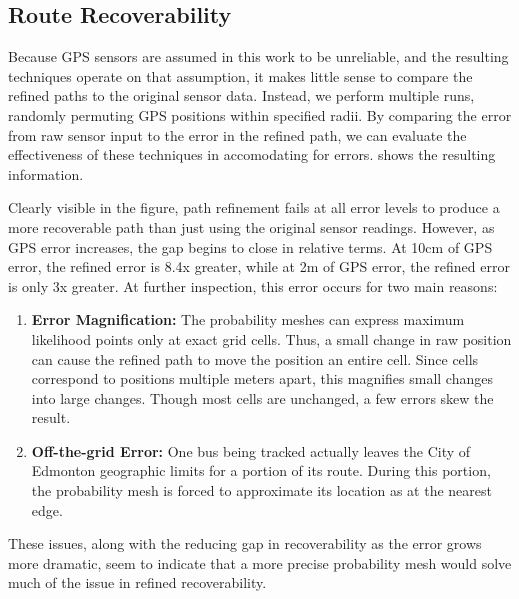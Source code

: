 

\subsection{Route Recoverability}

Because GPS sensors are assumed in this work to be unreliable, and the resulting techniques operate on that assumption, it makes little sense to compare the refined paths to the original sensor data. Instead, we perform multiple runs, randomly permuting GPS positions within specified radii. By comparing the error from raw sensor input to the error in the refined path, we can evaluate the effectiveness of these techniques in accomodating for errors.  shows the resulting information.



Clearly visible in the figure, path refinement fails at all error levels to produce a more recoverable path than just using the original sensor readings. However, as GPS error increases, the gap begins to close in relative terms. At 10cm of GPS error, the refined error is 8.4x greater, while at 2m of GPS error, the refined error is only 3x greater. At further inspection, this error occurs for two main reasons:
\begin{enumerate}
    \item \textbf{Error Magnification:} The probability meshes can express maximum likelihood points only at exact grid cells. Thus, a small change in raw position can cause the refined path to move the position an entire cell. Since cells correspond to positions multiple meters apart, this magnifies small changes into large changes. Though most cells are unchanged, a few errors skew the result.

    \item \textbf{Off-the-grid Error:} One bus being tracked actually leaves the City of Edmonton geographic limits for a portion of its route. During this portion, the probability mesh is forced to approximate its location as at the nearest edge.
\end{enumerate}

These issues, along with the reducing gap in recoverability as the error grows more dramatic, seem to indicate that a more precise probability mesh would solve much of the issue in refined recoverability.

%
%
%
